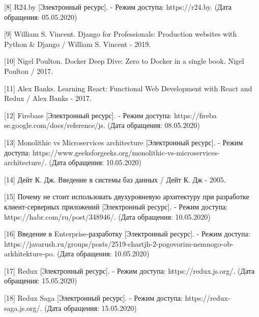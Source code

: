 [8] R24.by [Электронный ресурс]. - Режим доступа: https://r24.by. (Дата обращения: 05.05.2020)

[9] William S. Vincent. Django for Professionals: Production websites with Python \& Django / William S. Vincent - 2019.

[10] Nigel Poulton. Docker Deep Dive: Zero to Docker in a single book. Nigel Poulton / 2017.


[11] Alex Banks. Learning React: Functional Web Development with React and Redux / Alex Banks - 2017.

[12] Firebase [Электронный ресурс]. - Режим доступа: https://fireba  \linebreak se.google.com/docs/reference/js. (Дата обращения: 08.05.2020)

[13] Monolithic vs Microservices architecture [Электронный ресурс]. - Режим доступа: https://www.geeksforgeeks.org/monolithic-vs-microservices-\\architecture/. (Дата обращения: 10.05.2020)

[14] Дейт К. Дж. Введение в системы баз данных / Дейт К. Дж - 2005.

[15] Почему не стоит использовать двухуровневую архитектуру при разработке клиент-серверных приложений [Электронный ресурс]. - Режим доступа: https://habr.com/ru/post/348946/. (Дата обращения: 10.05.2020)

[16] Введение в Enterprise-разработку [Электронный ресурс]. - Режим доступа: https://javarush.ru/groups/posts/2519-chastjh-2-pogovorim-nemnogo-ob-arkhitekture-po. (Дата обращения: 10.05.2020)

[17] Redux [Электронный ресурс]. - Режим доступа: https://redux.js.org/. (Дата обращения: 15.05.2020)

[18] Redux Saga [Электронный ресурс]. - Режим доступа: https://redux-saga.js.org/. (Дата обращения: 15.05.2020)

